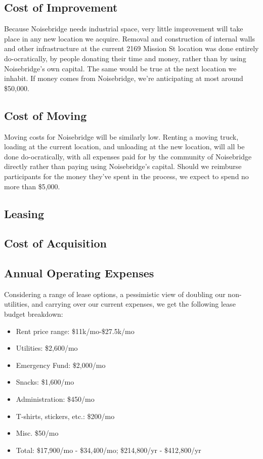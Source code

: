 \documentclass[12pt]{article}
\begin{document}
\subsection{Cost of Improvement}

Because Noisebridge needs industrial space, very little improvement will take place in any new location we acquire. Removal and construction of internal walls and other infrastructure at the current 2169 Mission St location was done entirely do-ocratically, by people donating their time and money, rather than by using Noisebridge's own capital. The same would be true at the next location we inhabit. If money comes from Noisebridge, we're anticipating at most around \$50,000.

\subsection{Cost of Moving}

Moving costs for Noisebridge will be similarly low. Renting a moving truck, loading at the current location, and unloading at the new location, will all be done do-ocratically, with all expenses paid for by the community of Noisebridge directly rather than paying using Noisebridge's capital. Should we reimburse participants for the money they've spent in the process, we expect to spend no more than \$5,000.

\subsection{Leasing}

\subsection{Cost of Acquisition}

\subsection{Annual Operating Expenses}

Considering a range of lease options, a pessimistic view of doubling our non-utilities, and carrying over our current expenses, we get the following lease budget breakdown:

\begin{itemize}
    \item Rent price range: \$11k/mo-\$27.5k/mo
    \item Utilities: \$2,600/mo
    \item Emergency Fund: \$2,000/mo
    \item Snacks: \$1,600/mo
    \item Administration: \$450/mo
    \item T-shirts, stickers, etc.: \$200/mo
    \item Misc. \$50/mo
    \item Total: \$17,900/mo - \$34,400/mo; \$214,800/yr - \$412,800/yr
\end{itemize}
\end{document}
